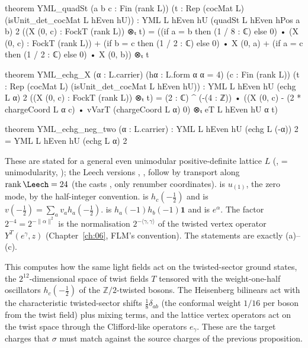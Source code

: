 \begin{leancode}
theorem YML_quadSt (a b c : Fin (rank L)) (t : Rep (cocMat L) (isUnit_det_cocMat L hEven hU)) :
    YML L hEven hU (quadSt L hEven hPos a b) 2 ((X (0, c) : FockT (rank L)) ⊗ₜ t)
      = ((if a = b then (1 / 8 : ℂ) else 0) • (X (0, c) : FockT (rank L))
          + (if b = c then (1 / 2 : ℂ) else 0) • X (0, a)
          + (if a = c then (1 / 2 : ℂ) else 0) • X (0, b)) ⊗ₜ t

theorem YML_echg_X (α : L.carrier) (hα : L.form α α = 4) (c : Fin (rank L))
    (t : Rep (cocMat L) (isUnit_det_cocMat L hEven hU)) :
    YML L hEven hU (echg L α) 2 ((X (0, c) : FockT (rank L)) ⊗ₜ t)
      = (2 : ℂ) ^ (-(4 : ℤ)) • ((X (0, c) - (2 * chargeCoord L α c) • vVarT (chargeCoord L α) 0)
          ⊗ₜ eT L hEven hU α t)

theorem YML_echg_neg_two (α : L.carrier) :
    YML L hEven hU (echg L (-α)) 2 = YML L hEven hU (echg L α) 2
\end{leancode}
\begin{dictionary}
These are stated for a general even unimodular positive-definite lattice $L$ (,
 = unimodularity, ); the Leech versions ,
,  follow by transport along $\operatorname{rank}\Leech=24$
(the casts ,  only renumber coordinates).  is $u_{(1)}$, the zero
mode, by the half-integer convention.  is $h_c(-\tfrac12)$ and
 is $v(-\tfrac12)=\sum_a v_ah_a(-\tfrac12)$.  is
$h_a(-1)h_b(-1)\mathbf 1$ and  is $e^\alpha$. The factor $2^{-4}=2^{-\|\alpha\|^2}$ is the
normalisation $2^{-\langle\gamma,\gamma\rangle}$ of the twisted vertex operator $Y^T(e^\gamma,z)$ (Chapter~\ref{ch:06},
FLM's convention). The statements are exactly (a)--(c).
\end{dictionary}
\begin{physics}
This computes how the same light fields act on the twisted-sector ground states, the $2^{12}$-dimensional space of twist fields $T$ tensored with the weight-one-half oscillators $h_c(-\tfrac12)$ of the $\mathbb Z/2$-twisted bosons. The Heisenberg bilinears act with the characteristic twisted-sector shifts $\tfrac18\delta_{ab}$ (the conformal weight $1/16$ per boson from the twist field) plus mixing terms, and the lattice vertex operators act on the twist space through the Clifford-like operators $e_\gamma$. These are the target charges that $\sigma$ must match against the source charges of the previous proposition.
\end{physics}

